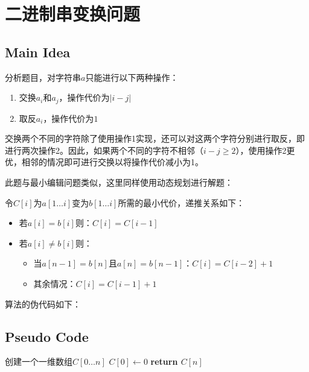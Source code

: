 \documentclass{ctexart}
\begin{document}
\section{二进制串变换问题}


\subsection{Main Idea}
分析题目，对字符串$a$只能进行以下两种操作：
\begin{enumerate}
    \item 交换$a_i$和$a_j$，操作代价为$|i-j|$
    \item 取反$a_i$，操作代价为$1$
\end{enumerate}

交换两个不同的字符除了使用操作1实现，还可以对这两个字符分别进行取反，即进行两次操作2。因此，如果两个不同的字符不相邻（$i-j \geq 2$），使用操作2更优，相邻的情况即可进行交换以将操作代价减小为1。

此题与最小编辑问题类似，这里同样使用动态规划进行解题：

令$C[i]$为$a[1 \ldots i]$变为$b[1 \ldots i]$所需的最小代价，递推关系如下：
\begin{itemize}
    \item 若$a[i] = b[i]$则：$C[i]=C[i-1]$
    \item 若$a[i] \neq b[i]$则：
    \begin{itemize}
        \item 当$a[n-1]=b[n]$且$a[n]=b[n-1]$：$C[i]=C[i-2]+1$
        \item 其余情况：$C[i]=C[i-1]+1$
    \end{itemize}
\end{itemize}
算法的伪代码如下：
\subsection{Pseudo Code}

\begin{algorithm}[H]
    \SetAlgoLined %
	\caption{$Operation-Cost(a,b,n)$}%
	\BlankLine
	\BlankLine
	创建一个一维数组$C[0\ldots n]$ \;
	$C[0] \leftarrow 0$ \;
	{
	{
	}
	}
	\textbf{return $C[n]$}
\end{algorithm}
\end{document}
